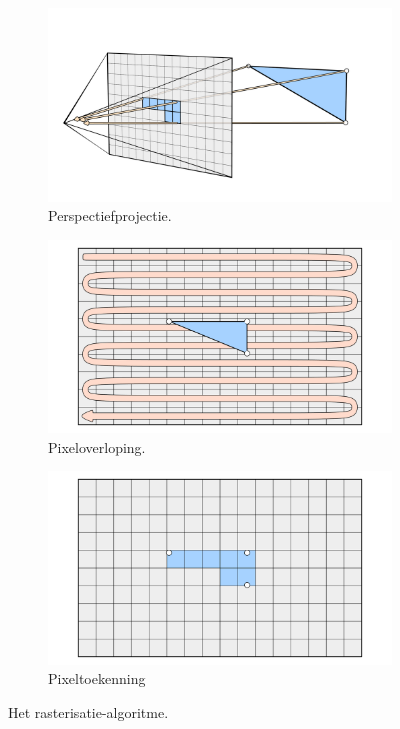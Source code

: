 \begin{figure}
  \centering
  \begin{subfigure}[b]{0.33\textwidth}
    \includegraphics[width=\textwidth]{./img/raw/rs-rasterisatie/rasterisation1.png}
    \caption{Perspectiefprojectie.}
    \label{fig:rs-rasterisatie:1}
  \end{subfigure}%
  \begin{subfigure}[b]{0.33\textwidth}
    \includegraphics[width=\textwidth]{./img/raw/rs-rasterisatie/rasterisation2.png}
    \caption{Pixeloverloping.}
    \label{fig:rs-rasterisatie:2}
  \end{subfigure}%
  \begin{subfigure}[b]{0.33\textwidth}
    \includegraphics[width=\textwidth]{./img/raw/rs-rasterisatie/rasterisation3.png}
    \caption{Pixeltoekenning}
    \label{fig:rs-rasterisatie:3}
  \end{subfigure}%
  \caption{Het rasterisatie-algoritme.}
  \label{fig:rs-rasterisatie}
\end{figure}
